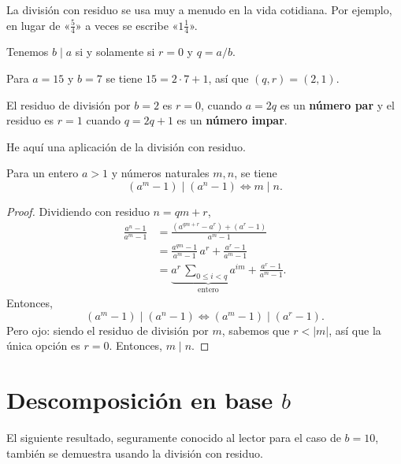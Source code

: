 La división con residuo se usa muy a menudo en la vida cotidiana. Por ejemplo,
en lugar de «$\frac{5}{4}$» a veces se escribe «$1\frac{1}{4}$».

\begin{ejemplo}
  Tenemos $b \mid a$ si y solamente si $r = 0$ y $q = a/b$.
\end{ejemplo}

\begin{ejemplo}
  Para $a = 15$ y $b = 7$ se tiene $15 = 2\cdot 7 + 1$, así que $(q,r) = (2,1)$.
\end{ejemplo}

\begin{ejemplo}
  El residuo de división por $b = 2$ es $r = 0$, cuando $a = 2q$ es un
  \textbf{número par} y el residuo es $r = 1$ cuando $q = 2q+1$ es un
  \textbf{número impar}.
\end{ejemplo}

He aquí una aplicación de la división con residuo.

\begin{proposicion}
  Para un entero $a > 1$ y números naturales $m, n$, se tiene
  $$(a^m - 1) \mid (a^n-1) \iff m \mid n.$$

  \begin{proof}
    Dividiendo con residuo
    $n = qm + r$,
    \begin{align*}
      \frac{a^n-1}{a^m-1} & = \frac{(a^{qm + r} - a^r) + (a^r - 1)}{a^m - 1} \\
                          & = \frac{a^{qm} - 1}{a^m - 1}\,a^r + \frac{a^r - 1}{a^m - 1} \\
                          & = \underbrace{a^r \, \sum_{0 \le i < q} a^{im}}_{\text{entero}} + \frac{a^r - 1}{a^m - 1}.
    \end{align*}
    Entonces,
    $$(a^m - 1) \mid (a^n-1) \iff (a^m - 1) \mid (a^r - 1).$$
    Pero ojo: siendo el residuo de división por $m$, sabemos que $r < |m|$, así
    que la única opción es $r = 0$. Entonces, $m \mid n$.
  \end{proof}
\end{proposicion}


\section{Descomposición en base $b$}

El siguiente resultado, seguramente conocido al lector para el caso de $b = 10$,
también se demuestra usando la división con residuo.

